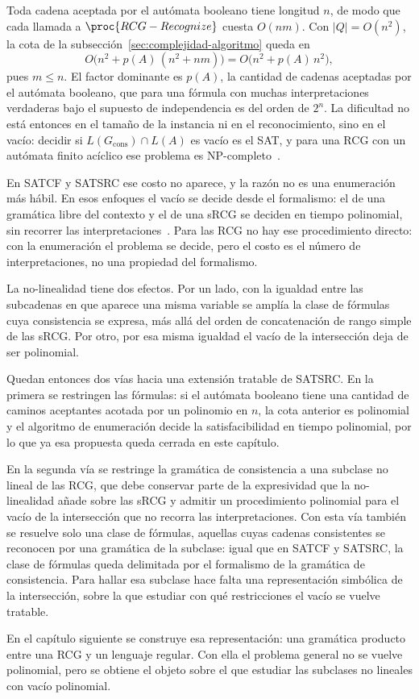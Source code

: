 \documentclass{report}
\theoremstyle{definition}
\theoremstyle{plain}
\theoremstyle{remark}
\begin{document}
Toda cadena aceptada por el autómata booleano tiene longitud $n$, de
modo que cada llamada a $\proc{RCG-Recognize}$ cuesta $O(nm)$. Con
$|Q| = O(n^2)$, la cota de la
subsección~\ref{sec:complejidad-algoritmo} queda en
\[
  O\bigl( n^2 + p(A)\,(n^2 + nm) \bigr) = O\bigl( n^2 + p(A)\,n^2 \bigr),
\]
pues $m \le n$. El factor dominante es $p(A)$, la cantidad de cadenas
aceptadas por el autómata booleano, que para una fórmula con muchas
interpretaciones verdaderas bajo el supuesto de independencia es del
orden de $2^n$. La dificultad no está entonces en el tamaño de la
instancia ni en el reconocimiento, sino en el vacío: decidir si
$L(G_{\mathrm{cons}}) \cap L(A)$ es vacío es el SAT, y para una RCG
con un autómata finito acíclico ese problema es
NP-completo~\cite{bertsch2001rcg}.

En SATCF y SATSRC ese costo no aparece, y la razón no es una enumeración
más hábil. En esos enfoques el vacío se decide desde el formalismo: el
de una gramática libre del contexto y el de una sRCG se deciden en
tiempo polinomial, sin recorrer las
interpretaciones~\cite{fernandezarias2007,aguileralopez2016}. Para las
RCG no hay ese procedimiento directo: con la enumeración el problema se
decide, pero el costo es el número de interpretaciones, no una propiedad
del formalismo.

La no-linealidad tiene dos efectos. Por un lado, con la igualdad
entre las subcadenas en que aparece una misma variable se amplía la
clase de fórmulas cuya consistencia se expresa, más allá del orden de
concatenación de rango simple de las sRCG. Por otro, por esa misma
igualdad el vacío de la intersección deja de ser polinomial.

Quedan entonces dos vías hacia una extensión tratable de SATSRC. En
la primera se restringen las fórmulas: si el autómata booleano tiene
una cantidad de caminos aceptantes acotada por un polinomio en $n$,
la cota anterior es polinomial y el algoritmo de enumeración
decide la satisfacibilidad en tiempo polinomial, por lo que ya esa
propuesta queda cerrada en este capítulo.

En la segunda vía se restringe la gramática de consistencia a una
subclase no lineal de las RCG, que debe conservar parte de la
expresividad que la no-linealidad añade sobre las sRCG y admitir un
procedimiento polinomial para el vacío de la intersección que no
recorra las interpretaciones. Con esta vía también se resuelve solo
una clase de fórmulas, aquellas cuyas cadenas consistentes se
reconocen por una gramática de la subclase: igual que en SATCF y
SATSRC, la clase de fórmulas queda delimitada por el formalismo de la
gramática de consistencia. Para hallar esa subclase hace falta una
representación simbólica de la intersección, sobre la que estudiar
con qué restricciones el vacío se vuelve tratable.

En el capítulo siguiente se construye esa representación: una gramática
producto entre una RCG y un lenguaje regular. Con ella el problema
general no se vuelve polinomial, pero se obtiene el objeto sobre el que
estudiar las subclases no lineales con vacío polinomial.




\end{document}
